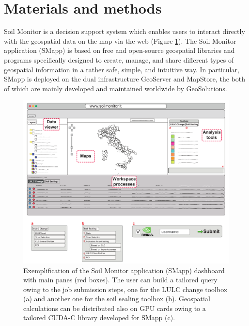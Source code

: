 \documentclass[APA,LATO1COL,doublespace]{WileyNJD-v2}
\begin{document}
\section{Materials and methods}
Soil Monitor is a decision support system which enables users to interact directly with the geospatial data on the map via the web (Figure \ref{fig:SMapp}).
The Soil Monitor application (SMapp) is based on free and open-source geospatial libraries and programs specifically designed to create, manage, and share different types of geospatial information in a rather safe, simple, and intuitive way.
In particular, SMapp is deployed on the dual infrastructure GeoServer and MapStore, the both of which are mainly developed and maintained worldwide by GeoSolutions.

\begin{figure}[t] %
    \centerline{\includegraphics[width=500pt]{Figure01.pdf}}
    \caption{Exemplification of the Soil Monitor application (SMapp) dashboard with main panes (red boxes). 
    The user can build a tailored query owing to the job submission steps, one for the LULC change toolbox (a) and another one for the soil sealing toolbox (b). 
    Geospatial calculations can be distributed also on GPU cards owing to a tailored CUDA-C library developed for SMapp (c). } \label{fig:SMapp}
\end{figure}
\end{document}

